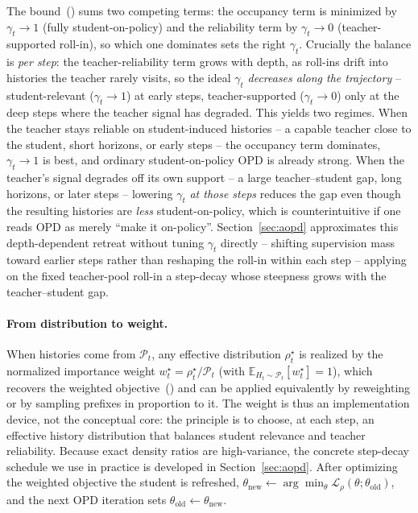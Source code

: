 The bound~() sums two competing terms: the occupancy term is
minimized by \(\gamma_t\!\to\!1\) (fully student-on-policy) and the reliability term by
\(\gamma_t\!\to\!0\) (teacher-supported roll-in), so which one dominates sets the right
\(\gamma_t\). Crucially the balance is \emph{per step}: the teacher-reliability term
grows with depth, as roll-ins drift into histories the teacher rarely visits, so the
ideal \(\gamma_t\) \emph{decreases along the trajectory} -- student-relevant
(\(\gamma_t\!\to\!1\)) at early steps, teacher-supported (\(\gamma_t\!\to\!0\)) only at
the deep steps where the teacher signal has degraded. This yields two regimes. When the
teacher stays reliable on student-induced histories -- a capable teacher close to the
student, short horizons, or early steps -- the occupancy term dominates, \(\gamma_t\!\to\!1\)
is best, and ordinary student-on-policy OPD is already strong. When the teacher's signal
degrades off its own support -- a large teacher--student gap, long horizons, or later
steps -- lowering \(\gamma_t\) \emph{at those steps} reduces the gap even though the
resulting histories are \emph{less} student-on-policy, which is counterintuitive if one
reads OPD as merely ``make it on-policy''. Section~\ref{sec:aopd} approximates this
depth-dependent retreat without tuning \(\gamma_t\) directly -- shifting supervision
mass toward earlier steps rather than reshaping the roll-in within each step --
applying on the fixed teacher-pool roll-in a step-decay whose steepness grows with the
teacher--student gap.

\paragraph{From distribution to weight.}

When histories come from \(\mathcal P_t\), any effective distribution
\(\rho_t^\star\) is realized by the normalized importance weight
\(w_t^\star=\rho_t^\star/\mathcal P_t\) (with
\(\mathbb E_{H_t\sim\mathcal P_t}[w_t^\star]=1\)), which recovers the weighted
objective~() and can be applied equivalently by reweighting or
by sampling prefixes in proportion to it. The weight is thus an implementation device,
not the conceptual core: the principle is to choose, at each step, an effective history
distribution that balances student relevance and teacher reliability. Because exact
density ratios are high-variance, the concrete step-decay schedule we use in
practice is developed in Section~\ref{sec:aopd}. After optimizing the weighted
objective the student is refreshed,
\(\theta_{\mathrm{new}}\leftarrow\arg\min_{\theta}\mathcal L_{\rho}(\theta;\theta_{\mathrm{old}})\),
and the next OPD iteration sets
\(\theta_{\mathrm{old}}\leftarrow\theta_{\mathrm{new}}\).

